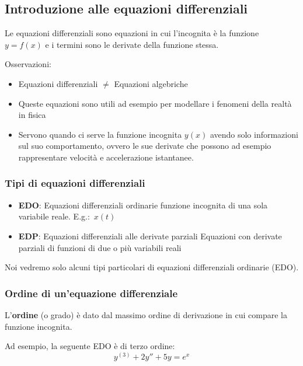 \subsection{Introduzione alle equazioni differenziali}

Le equazioni differenziali sono equazioni in cui l'incognita è la funzione \(y = f(x)\) e i termini sono le derivate della funzione stessa.

Osservazioni:
\begin{itemize}
    \item Equazioni differenziali \(\neq{}\) Equazioni algebriche
    \item Queste equazioni sono utili ad esempio per modellare i fenomeni della realtà in fisica
    \item Servono quando ci serve la funzione incognita \(y(x)\) avendo solo informazioni sul suo comportamento, ovvero le sue derivate che possono ad esempio rappresentare velocità e accelerazione istantanee.
\end{itemize}

\subsubsection{Tipi di equazioni differenziali}

\begin{itemize}
    \item \textbf{EDO}: Equazioni differenziali ordinarie\newline
          funzione incognita di una sola variabile reale. E.g.:\  \(x(t)\)
    \item \textbf{EDP}: Equazioni differenziali alle derivate parziali\newline
          Equazioni con derivate parziali di funzioni di due o più variabili reali
\end{itemize}

Noi vedremo solo alcuni tipi particolari di equazioni differenziali ordinarie (EDO).

\subsubsection{Ordine di un'equazione differenziale}

L'\textbf{ordine} (o grado) è dato dal massimo ordine di derivazione in cui compare la funzione incognita.

Ad esempio, la seguente EDO è di terzo ordine:
\[
    y^{(3)}+2y''+5y = e^x
\]

